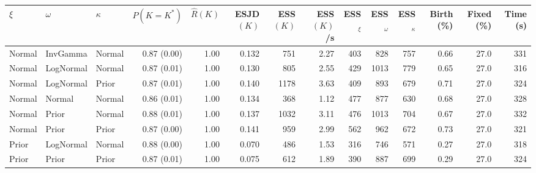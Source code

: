 
\begin{tabular}{l l l r r r r r r r r r r r}
  \toprule
  $\xi$ & $\omega$ & $\kappa$ & $P(K{=}K^*)$ & $\hat{R}(K)$ & ESJD$(K)$ & ESS$(K)$ & ESS$(K)$/s & ESS$_\xi$ & ESS$_\omega$ & ESS$_\kappa$ & Birth (\%) & Fixed (\%) & Time (s) \\
  \midrule
  Normal & InvGamma & Normal & 0.87 (0.00) & 1.00 & 0.132 & 751 & 2.27 & 403 & 828 & 757 & 0.66 & 27.0 & 331 \\
  Normal & LogNormal & Normal & 0.87 (0.01) & 1.00 & 0.130 & 805 & 2.55 & 429 & 1013 & 779 & 0.65 & 27.0 & 316 \\
  Normal & LogNormal & Prior & 0.87 (0.01) & 1.00 & 0.140 & 1178 & 3.63 & 409 & 893 & 679 & 0.71 & 27.0 & 324 \\
  Normal & Normal & Normal & 0.86 (0.01) & 1.00 & 0.134 & 368 & 1.12 & 477 & 877 & 630 & 0.68 & 27.0 & 328 \\
  Normal & Prior & Normal & 0.88 (0.01) & 1.00 & 0.137 & 1032 & 3.11 & 476 & 1013 & 704 & 0.67 & 27.0 & 332 \\
  Normal & Prior & Prior & 0.87 (0.00) & 1.00 & 0.141 & 959 & 2.99 & 562 & 962 & 672 & 0.73 & 27.0 & 321 \\
  Prior & LogNormal & Normal & 0.88 (0.00) & 1.00 & 0.070 & 486 & 1.53 & 316 & 746 & 571 & 0.27 & 27.0 & 318 \\
  Prior & Prior & Prior & 0.87 (0.01) & 1.00 & 0.075 & 612 & 1.89 & 390 & 887 & 699 & 0.29 & 27.0 & 324 \\
  \bottomrule
\end{tabular}
